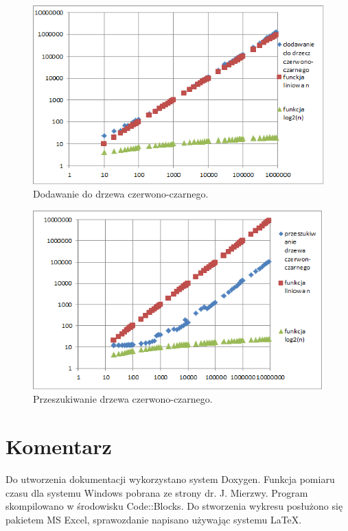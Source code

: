 	\begin{figure}
	\centering
	\includegraphics[scale=0.9]{3.png}
	\caption{Dodawanie do drzewa czerwono-czarnego.}
	\label{fig:3}
	\end{figure}
	\begin{figure}
	\centering
	\includegraphics[scale=0.9]{4.png}
	\caption{Przeszukiwanie drzewa czerwono-czarnego.}
	\label{fig:4}
	\end{figure}
	\section{Komentarz}\label{sec:Komentarz}
	Do utworzenia dokumentacji wykorzystano system Doxygen. Funkcja pomiaru czasu dla systemu Windows pobrana ze strony dr. J. Mierzwy. Program skompilowano w środowisku Code::Blocks. Do stworzenia wykresu posłużono się pakietem MS Excel, sprawozdanie napisano używając systemu \LaTeX.


